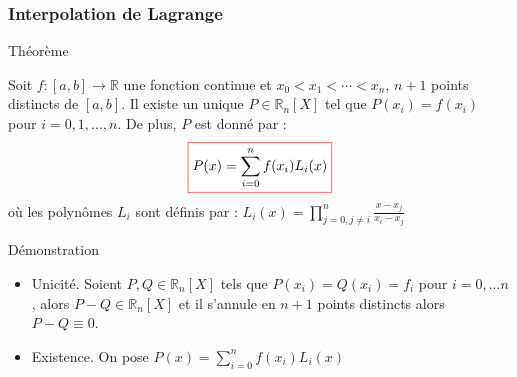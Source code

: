 \documentclass{beamer}
\newcommand{\myredbox}[1]{\fcolorbox{red}{white}{$\displaystyle#1$}}
\begin{document}
  \begin{frame}
	\frametitle{Interpolation de Lagrange}
	\begin{block}{Théorème}
	
		Soit $f : [a, b] \to \mathbb{R}$ une fonction continue et $x_0<x_1<\cdots <x_n$, 
$n + 1$ points distincts de $[a, b]$. Il existe un unique $P \in \mathbb{R}_n[X]$ tel que $P(x_i) = f(x_i)$ pour $i = 0, 1, ..., n$.
De plus, $P$ est donné par :
\[\myredbox{P(x)=\sum_{i=0}^nf(x_i) L_i(x)}\]
où les polynômes $L_i$ sont définis par : $L_i(x)=\prod_{j=0,j\neq i}^n\frac{x-x_j}{x_i-x_j}$

	
	
	\end{block}
	Démonstration
	\begin{itemize}
  	\item Unicité. Soient $P, Q \in \mathbb{R}_n[X]$ tels que $P(x_i) = Q(x_i) = f_i$ pour
  	 $i = 0, ...n$, alors $P - Q \in \mathbb{R}_n[X]$ et il s'annule en $n + 1$ points distincts alors $P - Q \equiv 0$.
	\item Existence. On pose $P(x)=\sum_{i=0}^nf(x_i) L_i(x)$
  \end{itemize}	 
	
\end{frame}
\end{document}
